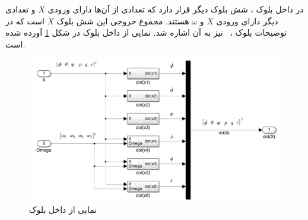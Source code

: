 در داخل بلوک
،
شش بلوک دیگر قرار دارد که تعدادی از آن‌ها دارای ورودی $X$ و تعدادی دیگر دارای ورودی $X$ و $\omega$ هستند. مجموع خروجی این شش بلوک $\dot X$ است که در توضیحات بلوک
،
 نیز به آن اشاره شد.
نمایی از داخل بلوک
در شکل \ref{all-six} آورده شده است.
\begin{figure}[H]
	\includegraphics[width=16cm]{../../Figures/QuadSimulation/all-six.png}
	\centering
	\caption{نمایی از داخل بلوک }
	\label{all-six}
\end{figure}